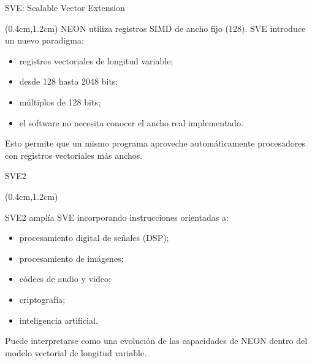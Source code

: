 
\begin{frame}{SVE: Scalable Vector Extension}
 \begin{textblock*}{\textwidth}(0.4cm,1.2cm)\justifying
  NEON utiliza registros SIMD de ancho fijo (\SI{128}{\bit}).
  \vspace{0.3cm}
  SVE introduce un nuevo paradigma:
  \vspace{0.3cm}
  \begin{itemize}
   \item registros vectoriales de longitud variable;
   \item desde 128 hasta 2048 bits;
   \item múltiplos de 128 bits;
   \item el software no necesita conocer el ancho real implementado.
  \end{itemize}
  \vspace{0.3cm}
  Esto permite que un mismo programa aproveche automáticamente procesadores con registros vectoriales más anchos.
 \end{textblock*}
\end{frame}


\begin{frame}{SVE2}
 \begin{textblock*}{\textwidth}(0.4cm,1.2cm)\justifying

  SVE2 amplía SVE incorporando instrucciones orientadas a:

  \begin{itemize}
   \item procesamiento digital de señales (DSP);
   \item procesamiento de imágenes;
   \item códecs de audio y video;
   \item criptografía;
   \item inteligencia artificial.
  \end{itemize}

  \vspace{0.4cm}

  Puede interpretarse como una evolución de las capacidades de NEON dentro del modelo vectorial de longitud variable.
 \end{textblock*}
\end{frame}


